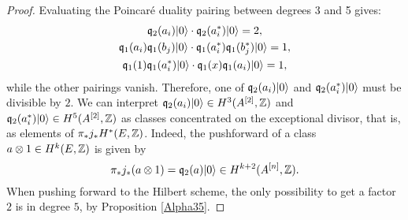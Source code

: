 \begin{proposition}
\begin{proof}
Evaluating the Poincar\'e duality pairing between degrees 3 and 5 gives:
\begin{gather*}
 \mathfrak{q}_2(a_i)|0\rangle \cdot \mathfrak{q}_2(a^*_i)|0\rangle = 2, \\
 \mathfrak{q}_1(a_i)\mathfrak{q}_1(b_j)|0\rangle \cdot  \mathfrak{q}_1(a^*_i)\mathfrak{q}_1(b^*_j)|0\rangle = 1, \\
 \mathfrak{q}_1(1)\mathfrak{q}_1(a^*_i)|0\rangle \cdot \mathfrak{q}_1(x)\mathfrak{q}_1(a_i)|0\rangle = 1,
\end{gather*}
while the other pairings vanish. Therefore, one of $\mathfrak{q}_2(a_i)|0\rangle$ and $\mathfrak{q}_2(a^*_i)|0\rangle$ must be divisible by $2$. 
We can interpret $\mathfrak{q}_2(a_i)|0\rangle\in H^3(A^{[2]},\mathbb{Z})$ and $\mathfrak{q}_2(a^*_i)|0\rangle\in H^5(A^{[2]},\mathbb{Z})$ as classes concentrated on the exceptional divisor, that is, as elements of $\pi_* j_*H^*(E,\mathbb{Z})$. Indeed,
the pushforward of a class $a\otimes 1 \in H^{k}(E,\mathbb{Z})$ is given by 
$$
\pi_* j_*(a\otimes 1) = \mathfrak{q}_2(a)|0\rangle \in H^{k+2}(A^{[n]},\mathbb{Z}).
$$
When pushing forward to the Hilbert scheme, the only possibility to get a factor $2$ is in degree $5$, by Proposition \ref{Alpha35}. 
\end{proof}

\end{proposition}
